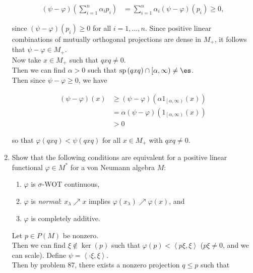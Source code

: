 \documentclass[a4paper,10pt]{report}
\DeclareMathOperator{\spec}{sp}
\DeclareMathOperator{\ker}{ker}
\begin{document}
\begin{enumerate}
\begin{align*}
  \left( \psi - \varphi \right) \left( \sum_{i = 1}^n \alpha_i p_i \right)%
  &= \sum_{i = 1}^n \alpha_i \left( \psi - \varphi \right) \left( p_i \right) \geq 0,
\end{align*}

since $\left( \psi - \varphi \right) \left( p_i \right) \geq 0$ for all $i = 1 , \ldots , n$.  Since positive linear combinations of mutually orthogonal projections are dense in $M_+$, it follows that $\psi - \varphi \in M_+$.\\
Now take $x \in M_+$ such that $q x q \neq 0$.\\
Then we can find $\alpha > 0$ such that $\spec \left( q x q \right) \cap \left[ \alpha , \infty \right) \neq \es$.\\
Then since $\psi - \varphi \geq 0$, we have

\begin{align*}
  \left( \psi - \varphi \right) \left( x \right)%
  &\geq \left( \psi - \varphi \right) \left( \alpha 1_{\left[ \alpha , \infty \right)} \left( x \right) \right)\\
  &= \alpha \left( \psi - \varphi \right) \left( 1_{\left[ \alpha , \infty \right)} \left( x \right) \right)\\
  &> 0
\end{align*}

so that $\varphi \left( q x q \right) < \psi \left( q x q \right)$ for all $x \in M_+$ with $q x q \neq 0$.\\
 \item Show that the following conditions are equivalent for a positive linear functional $\varphi \in M^*$ for a von Neumann algebra $M$:

\begin{enumerate}
\item $\varphi$ is $\sigma$-WOT continuous,
\item $\varphi$ is \textit{normal}: $x_\lambda \nearrow x$ implies $\varphi \left( x_\lambda \right) \nearrow \varphi \left( x \right)$, and
\item $\varphi$ is completely additive.
\end{enumerate}

\proof
Let $p \in P \left( M \right)$ be nonzero.\\
Then we can find $\xi \notin \ker \left( p \right)$ such that $\varphi \left( p \right) < \left\langle p \xi , \xi \right\rangle$ ($p \xi \neq 0$, and we can scale).  Define $\psi = \left\langle \cdot \xi , \xi \right\rangle$.\\
Then by problem 87, there exists a nonzero projection $q \leq p$ such that


\end{enumerate}
\end{document}
